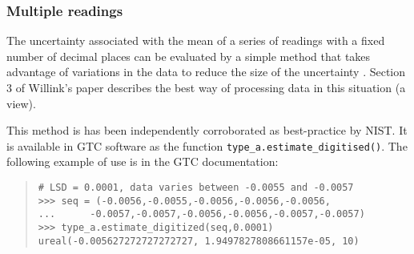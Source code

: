 \subsubsection{Multiple readings}
The uncertainty associated with the mean of a series of readings with a fixed number of decimal places can be evaluated by a simple method that takes advantage of variations in the data to reduce the size of the uncertainty \cite{WILLINK_07}. Section 3 of Willink's paper describes the best way of processing data in this situation (a view).
 
This method is has been independently corroborated as best-practice by NIST.  It is available in GTC software as the function \verb|type_a.estimate_digitised()|.   The following example of use is in the GTC documentation:
\begin{quote}
\begin{verbatim}
# LSD = 0.0001, data varies between -0.0055 and -0.0057
>>> seq = (-0.0056,-0.0055,-0.0056,-0.0056,-0.0056, 
...      -0.0057,-0.0057,-0.0056,-0.0056,-0.0057,-0.0057)
>>> type_a.estimate_digitized(seq,0.0001)
ureal(-0.005627272727272727, 1.9497827808661157e-05, 10)
\end{verbatim}
\end{quote}